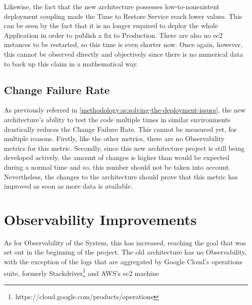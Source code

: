 Likewise, the fact that the new architecture possesses low-to-nonexistent deployment coupling made the Time to Restore Service reach lower values. This can be seen by the fact that it is no longer required to deploy the whole Application in order to publish a fix to Production. There are also no \gls{ec2} instances to be restarted, so this time is even shorter now. Once again, however, this cannot be observed directly and objectively since there is no numerical data to back up this claim in a mathematical way.

\subsection{Change Failure Rate}\label{results-and-discussion:ss:change-failure-rate}

As previously referred in \cref{methodology:ss:solving-the-deployment-issues}, the new architecture's ability to test the code multiple times in similar environments drastically reduces the Change Failure Rate. This cannot be measured yet, for multiple reasons. Firstly, like the other metrics, there are no Observability metrics for this metric. Secondly, since this new architecture project is still being developed actively, the amount of changes is higher than would be expected during a normal time and so, this number should not be taken into account.
Nevertheless, the changes to the architecture should prove that this metric has improved as soon as more data is available.


\section{Observability Improvements}\label{results-and-discussion:ss:observability-improvements}

As for Observability of the System, this has increased, reaching the goal that was set out in the beginning of the project.
The old architecture has no Observability, with the exception of the logs that are aggregated by Google Cloud's operations suite, formerly Stackdriver\footnote{https://cloud.google.com/products/operations\label{foot:stackdriver}} and AWS's \gls{ec2} machine 
